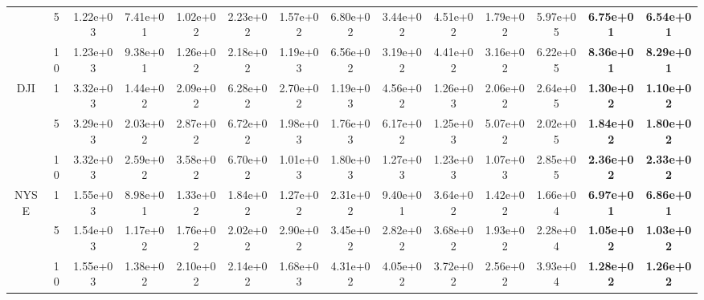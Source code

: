 \begin{table*}[!t]
{\begin{tabular}{cccccccccccccc}
                                     & 5                  & 1.22e+03                        & 7.41e+01                     & 1.02e+02                   & 2.23e+02                     & 1.57e+02          & 6.80e+02          & 3.44e+02 & 4.51e+02 & 1.79e+02          & 5.97e+05 & \textbf{6.75e+01} & \textbf{6.54e+01}\s \\ \cmidrule(l){3-14}
                                     & 10                 & 1.23e+03                        & 9.38e+01                     & 1.26e+02                   & 2.18e+02                     & 1.19e+03          & 6.56e+02          & 3.19e+02 & 4.41e+02 & 3.16e+02          & 6.22e+05 & \textbf{8.36e+01} & \textbf{8.29e+01}\s \\ \cmidrule(l){2-14}
            \multirow{3}{*}{DJI}     & 1                  & 3.32e+03                        & 1.44e+02                     & 2.09e+02                   & 6.28e+02                     & 2.70e+02          & 1.19e+03          & 4.56e+02 & 1.26e+03 & 2.06e+02          & 2.64e+05 & \textbf{1.30e+02} & \textbf{1.10e+02}\s \\ \cmidrule(l){3-14}
                                     & 5                  & 3.29e+03                        & 2.03e+02                     & 2.87e+02                   & 6.72e+02                     & 1.98e+03          & 1.76e+03          & 6.17e+02 & 1.25e+03 & 5.07e+02          & 2.02e+05 & \textbf{1.84e+02} & \textbf{1.80e+02}\s \\ \cmidrule(l){3-14}
                                     & 10                 & 3.32e+03                        & 2.59e+02                     & 3.58e+02                   & 6.70e+02                     & 1.01e+03          & 1.80e+03          & 1.27e+03 & 1.23e+03 & 1.07e+03          & 2.85e+05 & \textbf{2.36e+02} & \textbf{2.33e+02}\s \\ \cmidrule(l){2-14}
            \multirow{3}{*}{NYSE}    & 1                  & 1.55e+03                        & 8.98e+01                     & 1.33e+02                   & 1.84e+02                     & 1.27e+02          & 2.31e+02          & 9.40e+01 & 3.64e+02 & 1.42e+02          & 1.66e+04 & \textbf{6.97e+01} & \textbf{6.86e+01}\s \\ \cmidrule(l){3-14}
                                     & 5                  & 1.54e+03                        & 1.17e+02                     & 1.76e+02                   & 2.02e+02                     & 2.90e+02          & 3.45e+02          & 2.82e+02 & 3.68e+02 & 1.93e+02          & 2.28e+04 & \textbf{1.05e+02} & \textbf{1.03e+02}\s\\ \cmidrule(l){3-14}
                                     & 10                 & 1.55e+03                        & 1.38e+02                     & 2.10e+02                   & 2.14e+02                     & 1.68e+03          & 4.31e+02          & 4.05e+02 & 3.72e+02 & 2.56e+02          & 3.93e+04 & \textbf{1.28e+02} & \textbf{1.26e+02}\s \\ \bottomrule
        \end{tabular}}
\end{table*}